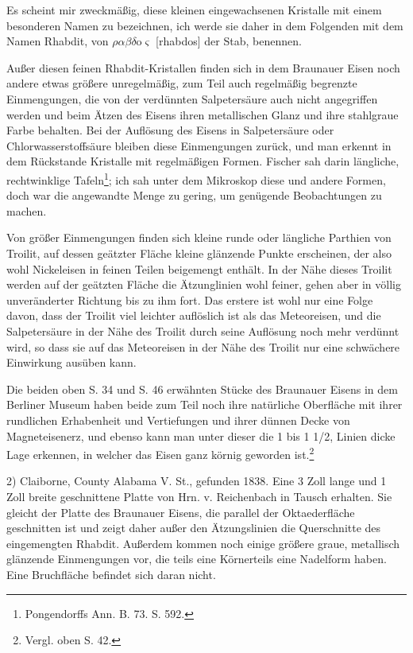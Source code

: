 \documentclass[a4paper, 11pt, oneside]{article}
\begin{document}
Es scheint mir zweckmäßig, diese kleinen eingewachsenen Kristalle mit einem besonderen Namen zu bezeichnen, ich werde sie daher in dem Folgenden mit dem Namen Rhabdit, von $\rho\alpha\beta\delta$o$\varsigma$ [rhabdos] der Stab, benennen.

Außer diesen feinen Rhabdit-Kristallen finden sich in dem Braunauer Eisen noch andere etwas größere unregelmäßig, zum Teil auch regelmäßig begrenzte Einmengungen, die von der verdünnten Salpetersäure auch nicht angegriffen werden und beim Ätzen des Eisens ihren metallischen Glanz und ihre stahlgraue Farbe behalten. Bei der Auflösung des Eisens in Salpetersäure oder Chlorwasserstoffsäure bleiben diese Einmengungen zurück, und man erkennt in dem Rückstande Kristalle mit regelmäßigen Formen. Fischer sah darin längliche, rechtwinklige Tafeln\footnote{Pongendorffs Ann. B. 73. S. 592.}; ich sah unter dem Mikroskop diese und andere Formen, doch war die angewandte Menge zu gering, um genügende Beobachtungen zu machen.

Von größer Einmengungen finden sich kleine runde oder längliche Parthien von Troilit, auf dessen geätzter Fläche kleine glänzende Punkte erscheinen, der also wohl Nickeleisen in feinen Teilen beigemengt enthält. In der Nähe dieses Troilit werden auf der geätzten Fläche die Ätzunglinien wohl feiner, gehen aber in völlig unveränderter Richtung bis zu ihm fort. Das erstere ist wohl nur eine Folge davon, dass der Troilit viel leichter auflöslich ist als das Meteoreisen, und die Salpetersäure in der Nähe des Troilit durch seine Auflösung noch mehr verdünnt wird, so dass sie auf das Meteoreisen in der Nähe des Troilit nur eine schwächere Einwirkung ausüben kann.

Die beiden oben S. 34 und S. 46 erwähnten Stücke des Braunauer Eisens in dem Berliner Museum haben beide zum Teil noch ihre natürliche Oberfläche mit ihrer rundlichen Erhabenheit und Vertiefungen und ihrer dünnen Decke von Magneteisenerz, und ebenso kann man unter dieser die 1 bis 1 1/2, Linien dicke Lage erkennen, in welcher das Eisen ganz körnig geworden ist.\footnote{Vergl. oben S. 42.}

2) Claiborne, County Alabama V. St., gefunden 1838. Eine 3 Zoll lange und 1 Zoll breite geschnittene Platte von Hrn. v. Reichenbach in Tausch erhalten. Sie gleicht der Platte des Braunauer Eisens, die parallel der Oktaederfläche geschnitten ist und zeigt daher außer den Ätzungslinien die Querschnitte des eingemengten Rhabdit. Außerdem kommen noch einige größere graue, metallisch glänzende Einmengungen vor, die teils eine Körnerteils eine Nadelform haben. Eine Bruchfläche befindet sich daran nicht.
\end{document}
